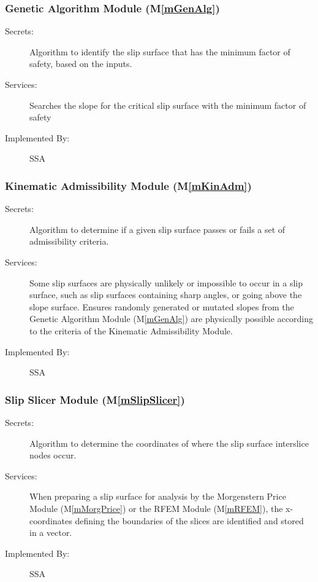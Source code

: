 \documentclass[12pt]{article}
\newcommand{\mref}[1]{M\ref{#1}}
\newcommand{\progname}[1]{SSA}
\begin{document}
\subsubsection{Genetic Algorithm Module (\mref{mGenAlg})}

\begin{description}
\item[Secrets:] Algorithm to identify the slip surface that has the
  minimum factor of safety, based on the inputs.
\item[Services:] Searches the slope for the critical slip surface with
  the minimum factor of safety 
\item[Implemented By:] \progname{}
\end{description}


\subsubsection{Kinematic Admissibility Module (\mref{mKinAdm})}

\begin{description}
\item[Secrets:] Algorithm to determine if a given slip surface passes
  or fails a set of admissibility criteria.
\item[Services:] Some slip surfaces are physically unlikely or
  impossible to occur in a slip surface, such as slip surfaces
  containing sharp angles, or going above the slope surface. Ensures
  randomly generated or mutated slopes from the Genetic Algorithm
  Module (\mref{mGenAlg}) are physically possible according to the
  criteria of the Kinematic Admissibility Module.
\item[Implemented By:] \progname{}
\end{description} 


\subsubsection{Slip Slicer Module (\mref{mSlipSlicer})}

\begin{description}
\item[Secrets:] Algorithm to determine the coordinates of where the
  slip surface interslice nodes occur.
\item[Services:] When preparing a slip surface for analysis by the
  Morgenstern Price Module (\mref{mMorgPrice}) or the RFEM Module
  (\mref{mRFEM}), the x-coordinates defining the boundaries of the
  slices are identified and stored in a vector.
\item[Implemented By:] \progname{}
\end{description} 
\end{document}
